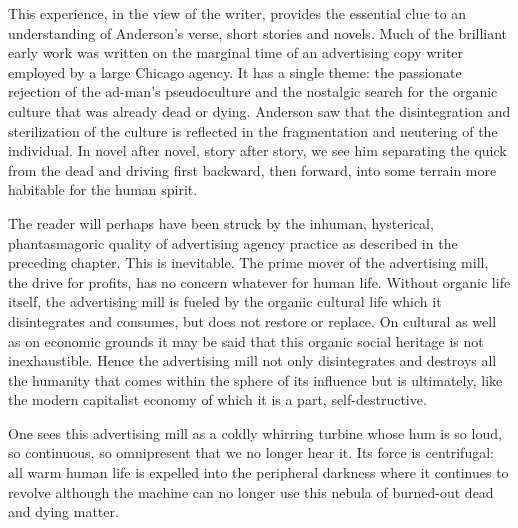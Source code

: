 \documentclass[nohyper,openany,nobib]{tufte-book}
\begin{document}
This experience, in the view of the writer, provides the essential clue
to an understanding of Anderson's verse, short stories and novels. Much
of the brilliant early work was written on the marginal time of an
advertising copy writer employed by a large Chicago agency. It has a
single theme: the passionate rejection of the ad-man's pseudoculture and
the nostalgic search for the organic culture that was already dead or
dying. Anderson saw that the disintegration and sterilization of the
culture is reflected in the fragmentation and neutering of the
individual. In novel after novel, story after story, we see him
separating the quick from the dead and driving first backward, then
forward, into some terrain more habitable for the human spirit.

The reader will perhaps have been struck by the inhuman, hysterical,
phantasmagoric quality of advertising agency practice as described in
the preceding chapter. This is inevitable. The prime mover of the
advertising mill, the drive for profits, has no concern whatever for
human life. Without organic life itself, the advertising mill is fueled
by the organic cultural life which it disintegrates and consumes, but
does not restore or replace. On cultural as well as on economic grounds
it may be said that this organic social heritage is not inexhaustible.
Hence the advertising mill not only disintegrates and destroys all the
humanity that comes within the sphere of its influence but is
ultimately, like the modern capitalist economy of which it is a part,
self-destructive.

One sees this advertising mill as a coldly whirring turbine whose hum is
so loud, so continuous, so omnipresent that we no longer hear it. Its
force is centrifugal: all warm human life is expelled into the
peripheral darkness where it continues to revolve although the machine
can no longer use this nebula of burned-out dead and dying matter.
\end{document}
